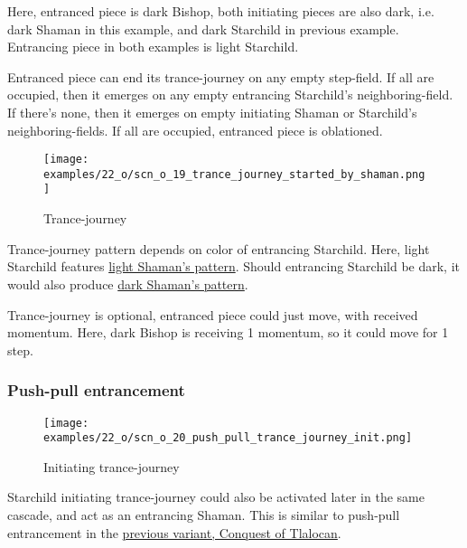 Here, entranced piece is dark Bishop, both initiating pieces are also dark, i.e. dark Shaman
in this example, and dark Starchild in previous example. Entrancing piece in both examples
is light Starchild.

Entranced piece can end its trance-journey on any empty step-field. If all are occupied, then it emerges
on any empty entrancing Starchild's neighboring-field. If there's none, then it emerges on empty initiating
Shaman or Starchild's neighboring-fields. If all are occupied, entranced piece is oblationed.

\clearpage %

\vspace*{-2.1\baselineskip}
\noindent
\begin{figure}[!h]
\texttt{[image: examples/22\_o/scn\_o\_19\_trance\_journey\_started\_by\_shaman.png]}
\caption{Trance-journey}
\label{fig:scn_o_19_trance_journey_started_by_shaman}
\end{figure}

Trance-journey pattern depends on color of entrancing Starchild. Here, light Starchild features
\hyperref[fig:scn_cot_14_light_shaman_trance_journey]{light Shaman's pattern}. Should entrancing
Starchild be dark, it would also produce
\hyperref[fig:scn_cot_16_dark_shaman_trance_journey]{dark Shaman's pattern}.

Trance-journey is optional, entranced piece could just move, with received momentum.
Here, dark Bishop is receiving 1 momentum, so it could move for 1 step.

\clearpage %

\subsubsection*{Push-pull entrancement}

\vspace*{-0.9\baselineskip}
\noindent
\begin{wrapfigure}[7]{l}{0.4\textwidth}
\centering
\texttt{[image: examples/22\_o/scn\_o\_20\_push\_pull\_trance\_journey\_init.png]}
\caption{Initiating trance-journey}
\label{fig:scn_o_20_push_pull_trance_journey_init}
\end{wrapfigure}
Starchild initiating trance-journey could also be activated later in the same cascade, and act as an
entrancing Shaman. This is similar to push-pull entrancement in the
\hyperref[fig:star/scn_cot_33_push_pull_entrancement_start]{previous variant, Conquest of Tlalocan}.

